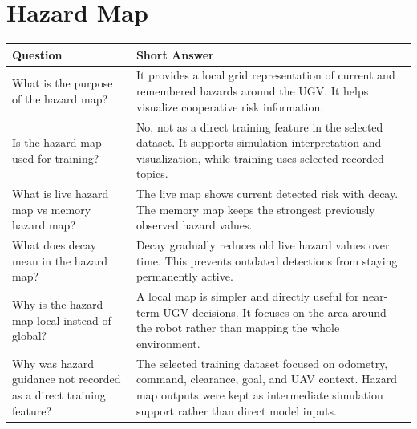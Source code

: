 \documentclass[11pt,a4paper]{article}
\begin{document}
\section*{Hazard Map}
\begin{longtable}{QA}
\toprule
\textbf{Question} & \textbf{Short Answer} \\
\midrule
\endhead
What is the purpose of the hazard map? &
It provides a local grid representation of current and remembered hazards around the UGV. It helps visualize cooperative risk information. \\
\addlinespace
Is the hazard map used for training? &
No, not as a direct training feature in the selected dataset. It supports simulation interpretation and visualization, while training uses selected recorded topics. \\
\addlinespace
What is live hazard map vs memory hazard map? &
The live map shows current detected risk with decay. The memory map keeps the strongest previously observed hazard values. \\
\addlinespace
What does decay mean in the hazard map? &
Decay gradually reduces old live hazard values over time. This prevents outdated detections from staying permanently active. \\
\addlinespace
Why is the hazard map local instead of global? &
A local map is simpler and directly useful for near-term UGV decisions. It focuses on the area around the robot rather than mapping the whole environment. \\
\addlinespace
Why was hazard guidance not recorded as a direct training feature? &
The selected training dataset focused on odometry, command, clearance, goal, and UAV context. Hazard map outputs were kept as intermediate simulation support rather than direct model inputs. \\
\bottomrule
\end{longtable}
\end{document}
